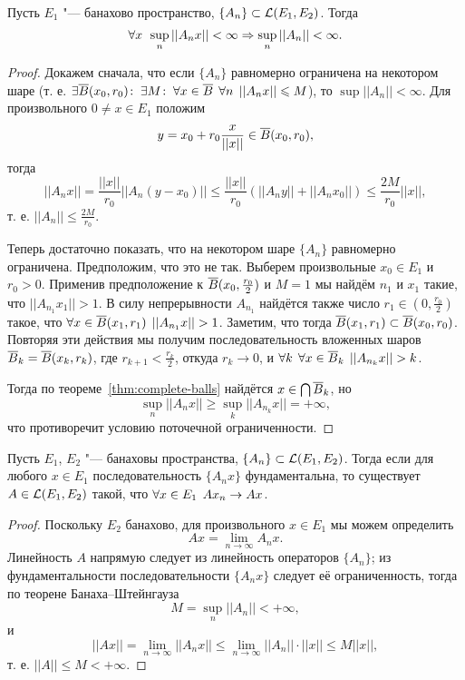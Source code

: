 \documentclass[main]{subfiles}
\begin{document}
\begin{theorem}\label{thm:operators-bsh}
  Пусть \( E_1 \) "--- банахово пространство,
  \( \{ A_n \} \subset \Linears{E_1}[E_2] \).
  Тогда
  \[
    \forall {x} \; \, \sup_n ||A_n x || < \infty
    \Rightarrow
    \sup_n ||A_n|| < \infty.
  \]
\end{theorem}
\begin{proof}
  Докажем сначала, что
  если \( \{ A_n \} \) равномерно ограничена
  на некотором шаре
  (т. е. \( \exists \overline{B}(x_0, r_0) \colon \: \exists M \colon \:
  \forall {x \in \overline{B}} \; \, \forall {n} \; \, ||A_n x|| \leqslant M \)),
  то \( \sup ||A_n|| < \infty \).
  Для произвольного \( 0 \ne x \in E_1 \) положим
  \[
    y = x_0 + r_0 \frac{x}{||x||} \in \overline{B}(x_0, r_0),
  \]
  тогда
  \[
    ||A_n x|| = \frac{||x||}{r_0} ||A_n (y - x_0)|| \le
    \frac{||x||}{r_0} (||A_n y|| + ||A_n x_0||) \le
    \frac{2 M}{r_0} ||x||,
  \]
  т. е. \( ||A_n|| \le \frac{2M}{r_0} \).

  Теперь достаточно показать, что на некотором
  шаре \( \{ A_n \} \) равномерно ограничена.
  Предположим, что это не так. Выберем произвольные
  \( x_0 \in E_1 \) и \( r_0 > 0 \).
  Применив предположение к \( \overline{B}(x_0, \frac{r_0}{2}) \)
  и \( M = 1 \) мы найдём \( n_1 \) и \( x_1 \) такие,
  что \( ||A_{n_1} x_1|| > 1 \).
  В силу непрерывности \( A_{n_1} \)
  найдётся также число \( r_1 \in (0, \frac{r_0}{2}) \)
  такое, что \( \forall {x \in \overline{B}(x_1, r_1)} \; \, ||A_{n_1} x|| > 1 \).
  Заметим, что тогда \( \overline{B}(x_1, r_1) \subset \overline{B}(x_0, r_0) \).
  Повторяя эти действия мы получим последовательность
  вложенных шаров \( \overline{B}_k = \overline{B}(x_k, r_k) \), где
  \( r_{k + 1} < \frac{r_k}{2} \), откуда \( r_k \to 0 \),
  и \( \forall {k} \; \, \forall {x \in \overline{B}_k} \; \, ||A_{n_k} x|| > k \).

  Тогда по теореме~\ref{thm:complete-balls}
  найдётся \( x \in \bigcap \overline{B}_k \),
  но
  \[
    \sup_n ||A_n x|| \ge \sup_k ||A_{n_k} x|| = +\infty,
  \]
  что противоречит условию поточечной ограниченности.
\end{proof}

\begin{theorem}
  Пусть \( E_1 \), \( E_2 \) "--- банаховы пространства,
  \( \{ A_n \} \subset \Linears{E_1}[E_2] \).
  Тогда если для любого \( x \in E_1 \)
  последовательность \( \{ A_n x \} \) фундаментальна,
  то существует \( A \in \Linears{E_1}[E_2] \) такой,
  что \( \forall {x \in E_1} \; \, A x_n \to A x \).
\end{theorem}
\begin{proof}
  Поскольку \( E_2 \) банахово,
  для произвольного \( x \in E_1 \)
  мы можем определить
  \[
    Ax = \lim_{n \to \infty} A_n x.
  \]
  Линейность \( A \) напрямую следует
  из линейность операторов \( \{ A_n \} \);
  из фундаментальности последовательности \( \{ A_n x \} \)
  следует её ограниченность,
  тогда по теорене Банаха--Штейнгауза
  \[
    M = \sup_n ||A_n|| < +\infty,
  \]
  и
  \[
    ||A x|| =
    \lim_{n \to \infty} ||A_n x|| \le
    \lim_{n \to \infty} ||A_n|| \cdot ||x|| \le
    M ||x||,
  \]
  т. е. \( ||A|| \le M < +\infty \).
\end{proof}
\end{document}
